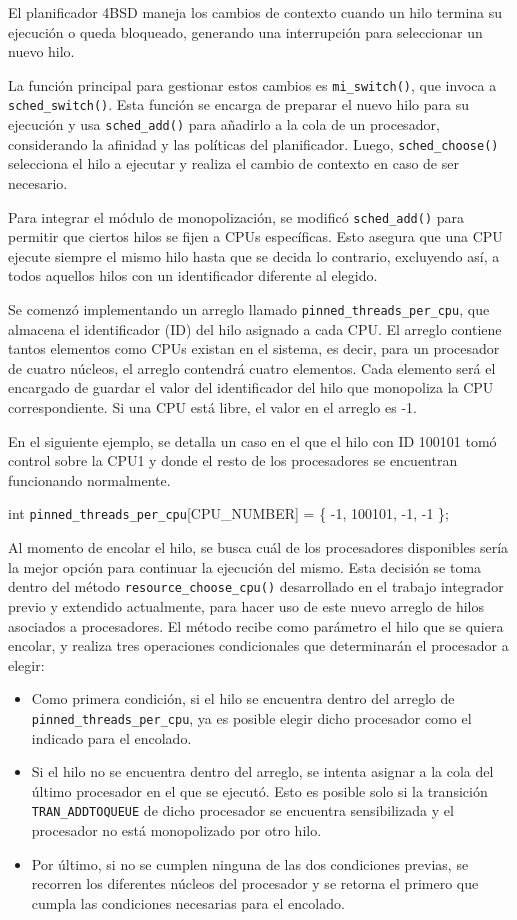 El planificador 4BSD maneja los cambios de contexto cuando un hilo termina su ejecución o queda bloqueado, generando una interrupción para seleccionar un nuevo hilo.

La función principal para gestionar estos cambios es \verb|mi_switch()|, que invoca a \verb|sched_switch()|. Esta función se encarga de preparar el nuevo hilo para su ejecución y usa \verb|sched_add()| para añadirlo a la cola de un procesador, considerando la afinidad y las políticas del planificador. Luego, \verb|sched_choose()| selecciona el hilo a ejecutar y realiza el cambio de contexto en caso de ser necesario.

Para integrar el módulo de monopolización, se modificó \verb|sched_add()| para permitir que ciertos hilos se fijen a CPUs específicas. Esto asegura que una CPU ejecute siempre el mismo hilo hasta que se decida lo contrario, excluyendo así, a todos aquellos hilos con un identificador diferente al elegido.

Se comenzó implementando un arreglo llamado \verb|pinned_threads_per_cpu|, que almacena el identificador (ID) del hilo asignado a cada CPU. El arreglo contiene tantos elementos como CPUs existan en el sistema, es decir, para un procesador de cuatro núcleos, el arreglo contendrá cuatro elementos. Cada elemento será el encargado de guardar el valor del identificador del hilo que monopoliza la CPU correspondiente. Si una CPU está libre, el valor en el arreglo es -1.

En el siguiente ejemplo, se detalla un caso en el que el hilo con ID 100101 tomó control sobre la CPU1 y donde el resto de los procesadores se encuentran funcionando normalmente.

int \verb|pinned_threads_per_cpu|[CPU\_NUMBER] = \{ -1, 100101, -1, -1 \};

Al momento de encolar el hilo, se busca cuál de los procesadores disponibles sería la mejor opción para continuar la ejecución del mismo. Esta decisión se toma dentro del método \verb|resource_choose_cpu()| desarrollado en el trabajo integrador previo y extendido actualmente, para hacer uso de este nuevo arreglo de hilos asociados a procesadores. El método recibe como parámetro el hilo que se quiera encolar, y realiza tres operaciones condicionales que determinarán el procesador a elegir:

\begin{itemize}
    \item Como primera condición, si el hilo se encuentra dentro del arreglo de \verb|pinned_threads_per_cpu|, ya es posible elegir dicho procesador como el indicado para el encolado.
    \item Si el hilo no se encuentra dentro del arreglo, se intenta asignar a la cola del último procesador en el que se ejecutó. Esto es posible solo si la transición \verb|TRAN_ADDTOQUEUE| de dicho procesador se encuentra sensibilizada y el procesador no está monopolizado por otro hilo.
    \item Por último, si no se cumplen ninguna de las dos condiciones previas, se recorren los diferentes núcleos del procesador y se retorna el primero que cumpla las condiciones necesarias para el encolado.
\end{itemize}

